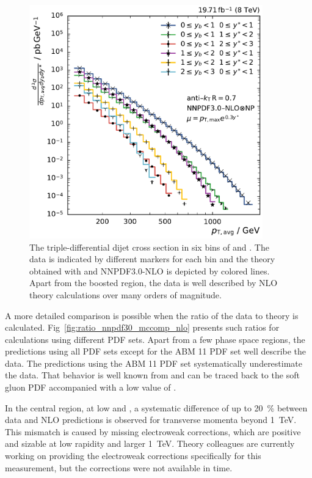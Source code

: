 \begin{figure}[h!tbp]
    \centering
    \includegraphics[width=0.9\textwidth]{figures/measurement/ptavg_spectrum.pdf}\hfill
    \caption[Spectrum of the triple-differential dijet cross section]{The
    triple-differential dijet cross section in six bins of \ystar and \yboost. The
    data is indicated by different markers for each bin and the theory obtained
    with \NLOJETPP and NNPDF3.0-NLO is depicted by colored lines. Apart from the
    boosted region, the data is well described by
    NLO theory calculations over many orders of magnitude.}
    \label{fig:measurement_result}
\end{figure}

A more detailed comparison is possible when the ratio of the data to theory is
calculated. Fig~\ref{fig:ratio_nnpdf30_mccomp_nlo} presents
such ratios for calculations using different PDF sets. Apart
from a few phase space regions, the predictions using all PDF sets except for
the ABM 11 PDF set well describe the data. The predictions using the ABM 11 PDF
set systematically underestimate the data. That behavior is well known \eg
from \cite{Khachatryan:2014waa,Stober:2012abc} and can be traced back to the
soft gluon PDF accompanied with a low value of \asmz.

In the central region, at low \yboost and \ystar, a systematic difference of up
to \SI{20}{\percent} between data and NLO predictions is observed for transverse
momenta beyond \SI{1}{\TeV}. This mismatch is caused by missing electroweak
corrections, which are positive and sizable at low rapidity and \pt larger
\SI{1}{\TeV}. Theory colleagues are currently working on providing the
electroweak corrections specifically for this measurement, but the corrections
were not available in time.


